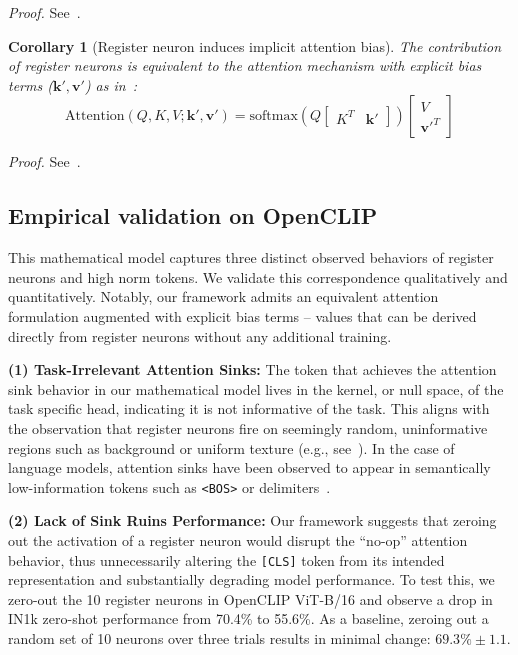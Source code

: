 \documentclass{article}
\begin{document}
\textit{Proof.} See~.

\newtheorem{corollary}{Corollary}
\begin{corollary}[Register neuron induces implicit attention bias]
\label{corollary:register_bias} The contribution of register neurons is equivalent to the attention mechanism with explicit bias terms  ($\mathbf{k}', \mathbf{v}'$) as in~\cite{sunmassive}: $$\text{Attention}(Q, K, V; \mathbf{k}', \mathbf{v}') = \text{softmax}\left( Q \begin{bmatrix} K^T & \mathbf{k}' \end{bmatrix} \right) \begin{bmatrix} V \\ \mathbf{v}'^T \end{bmatrix}$$ 
\end{corollary}

\textit{Proof.} See~.



\subsection{Empirical validation on OpenCLIP}
This mathematical model captures three distinct observed behaviors of register neurons and high norm tokens. We validate this correspondence qualitatively and quantitatively. Notably, our framework admits an equivalent attention formulation augmented with explicit bias terms -- values that can be derived directly from register neurons without any additional training.

\textbf{(1) Task-Irrelevant Attention Sinks:} The token that achieves the attention sink behavior in our mathematical model lives in the kernel, or null space, of the task specific head, indicating it is not informative of the task. This aligns with the observation that register neurons fire on seemingly random, uninformative regions such as background or uniform texture (e.g., see~). In the case of language models, attention sinks have been observed to appear in semantically low-information tokens such as \texttt{<BOS>} or delimiters~\citep{xiaoefficient}.

\textbf{(2) Lack of Sink Ruins Performance:} Our framework suggests that zeroing out the activation of a register neuron would disrupt the ``no-op'' attention behavior, thus unnecessarily altering the \texttt{[CLS]} token from its intended representation and substantially degrading model performance. To test this, we zero-out the 10 register neurons in OpenCLIP ViT-B/16 and observe a drop in IN1k zero-shot performance from 70.4\% to 55.6\%. As a baseline, zeroing out a random set of 10 neurons over three trials results in minimal change: $69.3\%\pm1.1$. 
\end{document}
